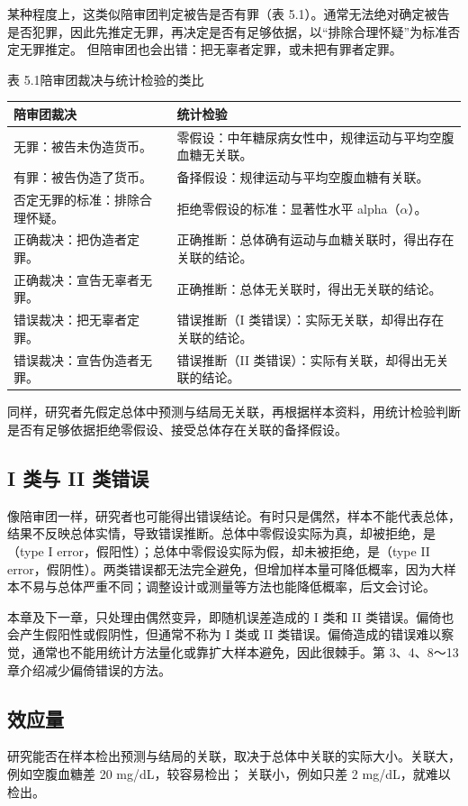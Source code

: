 某种程度上，这类似陪审团判定被告是否有罪（表 5.1）。通常无法绝对确定被告是否犯罪，因此先推定无罪，再决定是否有足够依据，以“排除合理怀疑”为标准否定无罪推定。
但陪审团也会出错：把无辜者定罪，或未把有罪者定罪。
\begin{bookbox}{表 5.1\quad 陪审团裁决与统计检验的类比}
\begin{tabularx}{\linewidth}{YY}
\toprule 陪审团裁决 & 统计检验\\\midrule
无罪：被告未伪造货币。 & 零假设：中年糖尿病女性中，规律运动与平均空腹血糖无关联。\\
有罪：被告伪造了货币。 & 备择假设：规律运动与平均空腹血糖有关联。\\
否定无罪的标准：排除合理怀疑。 & 拒绝零假设的标准：显著性水平 alpha（$\alpha$）。\\
正确裁决：把伪造者定罪。 & 正确推断：总体确有运动与血糖关联时，得出存在关联的结论。\\
正确裁决：宣告无辜者无罪。 & 正确推断：总体无关联时，得出无关联的结论。\\
错误裁决：把无辜者定罪。 & 错误推断（I 类错误）：实际无关联，却得出存在关联的结论。\\
错误裁决：宣告伪造者无罪。 & 错误推断（II 类错误）：实际有关联，却得出无关联的结论。\\\bottomrule
\end{tabularx}
\end{bookbox}
同样，研究者先假定总体中预测与结局无关联，再根据样本资料，用统计检验判断是否有足够依据拒绝零假设、接受总体存在关联的备择假设。

\subsection{I 类与 II 类错误}
像陪审团一样，研究者也可能得出错误结论。有时只是偶然，样本不能代表总体，结果不反映总体实情，导致错误推断。总体中零假设实际为真，却被拒绝，是（type I error，假阳性）；总体中零假设实际为假，却未被拒绝，是（type II error，假阴性）。两类错误都无法完全避免，但增加样本量可降低概率，因为大样本不易与总体严重不同；调整设计或测量等方法也能降低概率，后文会讨论。

本章及下一章，只处理由偶然变异，即随机误差造成的 I 类和 II 类错误。偏倚也会产生假阳性或假阴性，但通常不称为 I 类或 II 类错误。偏倚造成的错误难以察觉，通常也不能用统计方法量化或靠扩大样本避免，因此很棘手。第 3、4、8～13 章介绍减少偏倚错误的方法。

\subsection{效应量}
研究能否在样本检出预测与结局的关联，取决于总体中关联的实际大小。关联大，例如空腹血糖差 20 mg/dL，较容易检出；
关联小，例如只差 2 mg/dL，就难以检出。

